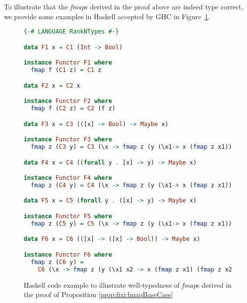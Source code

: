 To illustrate that the \textit{fmap}s derived in the proof above are indeed
type correct, we provide some examples in Haskell accepted by GHC in
Figure~\ref{fig:deriveFunctor}.
\begin{figure}
\begin{singlespace}
\begin{lstlisting}[basicstyle={\ttfamily\small},language=Haskell,mathescape]
{-# LANGUAGE RankNTypes #-}

data F1 x = C1 (Int -> Bool)

instance Functor F1 where
  fmap f (C1 z) = C1 z

data F2 x = C2 x

instance Functor F2 where
  fmap f (C2 z) = C2 (f z)

data F3 x = C3 (([x] -> Bool) -> Maybe x)

instance Functor F3 where
  fmap z (C3 y) = C3 (\x -> fmap z (y (\x1-> x (fmap z x1))))

data F4 x = C4 ((forall y . [x] -> y) -> Maybe x)

instance Functor F4 where
  fmap z (C4 y) = C4 (\x -> fmap z (y (\x1-> x (fmap z x1))))

data F5 x = C5 (forall y . ([x] -> y) -> Maybe x)

instance Functor F5 where
  fmap z (C5 y) = C5 (\x -> fmap z (y (\x1-> x (fmap z x1))))

data F6 x = C6 (([x] -> ([x] -> Bool)) -> Maybe x)

instance Functor F6 where
  fmap z (C6 y) =
    C6 (\x -> fmap z (y (\x1 x2 -> x (fmap z x1) (fmap z x2))))
\end{lstlisting}
\end{singlespace}
\caption{Haskell code example to illustrate well-typedness of \textit{fmap}s
        derived in the proof of Proposition \ref{prop:fixi:fmapBaseCase}}
\label{fig:deriveFunctor}
\end{figure}

